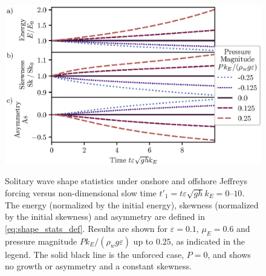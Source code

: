 \documentclass{jfm}
\renewcommand*{\epsilon}{\varepsilon}
\begin{document}
\begin{figure}
  \centering
  { %
    \label{fig:statistics_solitary:a}
    \label{fig:statistics_solitary:b}
    \label{fig:statistics_solitary:c}
  }
  \includegraphics{Skew-Asymm-Production.eps}
  \caption{
    Solitary wave shape statistics under onshore and offshore
    Jeffreys forcing versus non-dimensional slow time $t'_1 = t
    \epsilon \sqrt{gh} k_E = \numrange{0}{10}$.
    The
    energy (normalized by the initial energy),
    skewness (normalized by the initial skewness) and
    asymmetry are defined in
    \cref{eq:shape_stats_def}.
    Results are shown for $\epsilon=0.1$, $\mu_E = 0.6$ and pressure
    magnitude $P k_E/(\rho_w g \epsilon)$ up to $0.25$, as indicated in
    the legend.
    The solid black line is the unforced case, $P = 0$, and
    shows no growth or asymmetry and a constant skewness.
  }\label{fig:statistics_solitary}
\end{figure}
\end{document}
